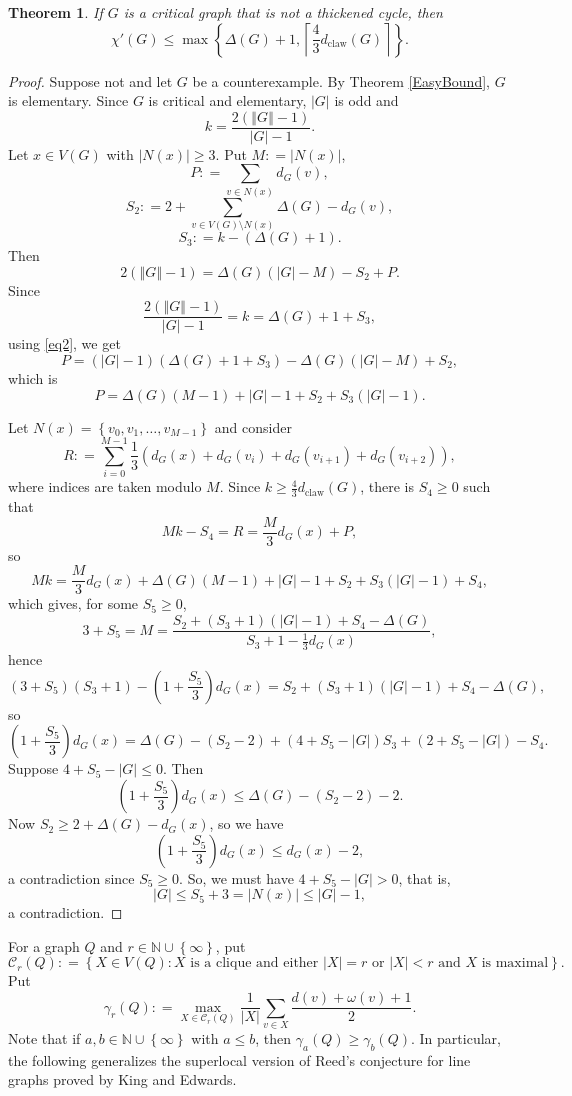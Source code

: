 \documentclass[12pt]{amsart}
\theoremstyle{plain}
\newtheorem{thm}{Theorem}
\theoremstyle{definition}
\theoremstyle{remark}
\newcommand{\fancy}[1]{\mathcal{#1}}
\newcommand{\C}{\fancy{C}}
\newcommand{\IN}{\mathbb{N}}
\newcommand{\set}[1]{\left\{ #1 \right\}}
\newcommand{\setb}[3]{\left\{ #1 \in #2 : #3 \right\}}
\newcommand{\card}[1]{\left|#1\right|}
\newcommand{\size}[1]{\left\Vert#1\right\Vert}
\newcommand{\ceil}[1]{\left\lceil#1\right\rceil}
\newcommand{\parens}[1]{\left( #1 \right)}
\newcommand{\DefinedAs}{\mathrel{\mathop:}=}
\newcommand{\dclaw}[1]{d_{\text{claw}}\left( #1 \right)}
\begin{document}
\begin{thm}
\label{EasyBound2}
If $G$ is a critical graph that is not a thickened cycle, then
\[\chi'(G) \le \max\set{\Delta(G) + 1, \ceil{\frac43\dclaw{G}}}.\]
\end{thm}
\begin{proof}
Suppose not and let $G$ be a counterexample. By Theorem \ref{EasyBound}, $G$ is elementary.
Since $G$ is critical and elementary, $\card{G}$ is odd and
\begin{equation}\label{eq1}
k = \frac{2(\size{G} - 1)}{\card{G} - 1}.
\end{equation}
Let $x \in V(G)$ with $\card{N(x)} \ge 3$. Put $M \DefinedAs \card{N(x)}$, 
\[P \DefinedAs \sum_{v \in N(x)} d_G(v),\]
\[S_2 \DefinedAs 2 + \sum_{v \in V(G) \setminus N(x)} \Delta(G) - d_G(v),\]
\[S_3 \DefinedAs k - (\Delta(G) + 1).\] 
Then
\begin{equation}\label{eq2}
2(\size{G} - 1) = \Delta(G)(|G| - M) - S_2 + P.
\end{equation}
Since 
\[\frac{2(\size{G} - 1)}{\card{G} - 1} = k = \Delta(G) + 1 + S_3,\]
using \eqref{eq2}, we get
\[P = (|G| - 1)(\Delta(G) + 1 + S_3) - \Delta(G)(|G| - M) + S_2,\]
which is
\begin{equation}\label{eq3}
P = \Delta(G)(M-1) + |G| - 1 + S_2 + S_3(|G| - 1).
\end{equation}

Let $N(x) = \set{v_0, v_1, \ldots, v_{M-1}}$ and consider
\[R \DefinedAs \sum_{i=0}^{M - 1} \frac13 \parens{d_G(x) + d_G(v_i) + d_G(v_{i+1}) + d_G(v_{i+2})},\]
where indices are taken modulo $M$.  Since $k \ge \frac43\dclaw{G}$, there is $S_4 \ge 0$ such that
\[Mk - S_4 = R = \frac{M}{3}d_G(x) + P,\]
so
\[Mk = \frac{M}{3}d_G(x) + \Delta(G)(M-1) + |G| - 1 + S_2 + S_3(|G| - 1) + S_4,\]
which gives, for some $S_5 \ge 0$,
\[3 + S_5 = M =  \frac{S_2 + (S_3 + 1)(|G| - 1) + S_4 -\Delta(G)}{S_3 + 1 - \frac13d_G(x)}, \]
hence
\[(3 + S_5)(S_3 + 1) - \parens{1 + \frac{S_5}{3}}d_G(x) = S_2 + (S_3 + 1)(|G| - 1) + S_4 -\Delta(G),\]
so
\[\parens{1 + \frac{S_5}{3}}d_G(x) = \Delta(G)  - (S_2 - 2) + \parens{4 + S_5 - |G|}S_3 + \parens{2 + S_5 - |G|} - S_4.\]
Suppose $4 + S_5 - |G| \le 0$.  Then
\[\parens{1 + \frac{S_5}{3}}d_G(x) \le \Delta(G)  - (S_2 - 2) - 2.\]
Now $S_2 \ge 2 + \Delta(G) - d_G(x)$, so we have
\[\parens{1 + \frac{S_5}{3}}d_G(x) \le d_G(x) - 2,\]
a contradiction since $S_5 \ge 0$.  So, we must have $4 + S_5 - |G| > 0$, that is, 
\[|G| \le S_5 + 3 = |N(x)| \le |G| - 1,\] a contradiction.
\end{proof}
For a graph $Q$ and $r \in \IN \cup \set{\infty}$, put 
\[\C_r(Q) \DefinedAs \setb{X}{V(Q)}{X \text{ is a clique and either } |X| = r \text { or } |X| < r \text{ and } X \text { is maximal}}.\]
Put
\[\gamma_r(Q) \DefinedAs \max_{X \in \C_r(Q)} \frac{1}{|X|}\sum_{v \in X} \frac{d(v) + \omega(v) + 1}{2}.\]
Note that if $a, b \in \IN \cup \set{\infty}$ with $a \le b$, then $\gamma_a(Q) \ge \gamma_b(Q)$.  In particular, the following generalizes the superlocal version of Reed's conjecture for line graphs
proved by King and Edwards.
\end{document}
